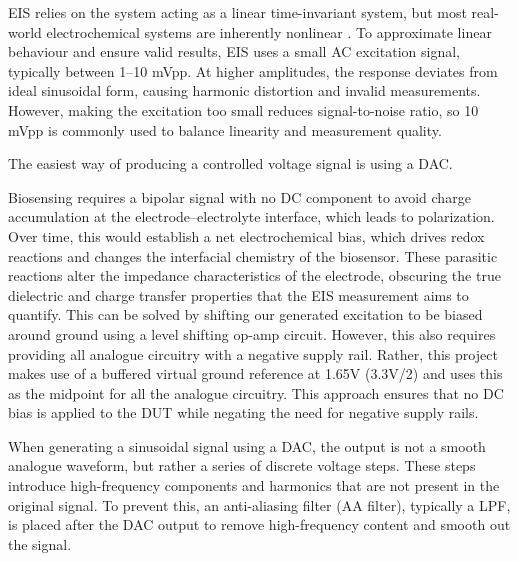 \Ac{EIS} relies on the system acting as a linear time-invariant system, but most real-world electrochemical systems are inherently nonlinear \cite{ElectrochemicalMeasurementsElectrochemical}. To approximate linear behaviour and ensure valid results, EIS uses a small AC excitation signal, typically between 1–10 mVpp\cite{EISQualityIndicators}\cite{lazanasErratumElectrochemicalImpedance2025}. At higher amplitudes, the response deviates from ideal sinusoidal form, causing harmonic distortion and invalid measurements. However, making the excitation too small reduces signal-to-noise ratio, so 10 mVpp is commonly used to balance linearity and measurement quality.

The easiest way of producing a controlled voltage signal is using a \ac{DAC}.  

Biosensing requires a bipolar signal with no DC component to avoid charge accumulation at the electrode–electrolyte interface, which leads to polarization. Over time, this would establish a net electrochemical bias, which drives redox reactions and changes the interfacial chemistry of the biosensor. These parasitic reactions alter the impedance characteristics of the electrode, obscuring the true dielectric and charge transfer properties that the EIS measurement aims to quantify. This can be solved by shifting our generated excitation to be biased around ground using a level shifting op-amp circuit. However, this also requires providing all analogue circuitry with a negative supply rail. Rather, this project makes use of a buffered virtual ground reference at 1.65V (3.3V/2) and uses this as the midpoint for all the analogue circuitry. This approach ensures that no DC bias is applied to the \ac{DUT} while negating the need for negative supply rails.

When generating a sinusoidal signal using a \ac{DAC}, the output is not a smooth analogue waveform, but rather a series of discrete voltage steps. These steps introduce high-frequency components and harmonics that are not present in the original signal.  To prevent this, an anti-aliasing filter (AA filter), typically a \ac{LPF}, is placed after the DAC output to remove high-frequency content and smooth out the signal.

